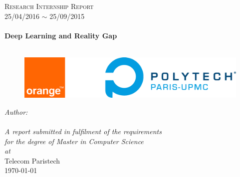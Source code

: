 \documentclass[twoside,11pt,a4paper,openright]{Thesis} %
\begin{document}
\begin{titlepage}
\begin{center}

\textsc{\LARGE Research Internship Report}\\[0.1cm]
 {\Large 25/04/2016  $\sim$  25/09/2015}\\[0.5cm] %

\HRule \\[0.4cm] %
{\textbf{\huge  Deep Learning and Reality Gap}}\\[0cm] %
\HRule \\[2.5cm] %

\begin{figure}[htbp]
	\centering
		\includegraphics[width=\textwidth,height=\textheight,keepaspectratio]{Figures/logo.png}
\end{figure}
\vspace{2.2cm}

\emph{\LARGE Author:}\\[0.2cm]
{\LARGE\authornames}\\[2.8cm]%




\large \textit{A report submitted in fulfilment of the requirements\\ for the degree of Master in Computer Science}\\[0.3cm] %
\textit{at}\\[0.4cm]
{\Large Telecom Paristech}\\[2.5cm] %

{\large \today}\\[4cm] %

\vfill
\end{center}
\cleardoublepage
\end{titlepage}
\end{document}
